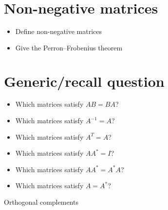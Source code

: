 \documentclass[a4paper]{article}
\begin{document}
\section{Non-negative matrices}

\begin{itemize}
  \item Define non-negative matrices
  \item Give the Perron--Frobenius theorem
\end{itemize}

\section{Generic/recall question}

\begin{itemize}
  \item Which matrices satisfy $A B = B A$?
  \item Which matrices satisfy $A^{-1} = A$?
  \item Which matrices satisfy $A^{T} = A$?
  \item Which matrices satisfy $AA^* = I$?
  \item Which matrices satisfy $AA^* = A^*A$?
  \item Which matrices satisfy $A = A^*$?
\end{itemize}


Orthogonal complements
\end{document}
